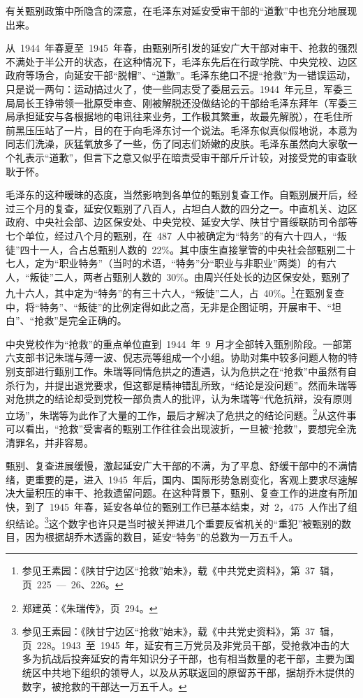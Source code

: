 有关甄别政策中所隐含的深意，在毛泽东对延安受审干部的“道歉”中也充分地展现出来。

从~1944~年春夏至~1945~年春，由甄别所引发的延安广大干部对审干、抢救的强烈不满处于半公开的状态，在这种情况下，毛泽东先后在行政学院、中央党校、边区政府等场合，向延安干部“脱帽”、“道歉”。毛泽东绝口不提“抢救”为一错误运动，只是说一两句：运动搞过火了，使一些同志受了委屈云云。1944~年元旦，军委三局局长王铮带领一批原受审查、刚被解脱还没做结论的干部给毛泽东拜年（军委三局承担延安与各根据地的电讯往来业务，工作极其繁重，故最先解脱），在毛住所前黑压压站了一片，目的在于向毛泽东讨一个说法。毛泽东似真似假地说，本意为同志们洗澡，灰猛氧放多了一些，伤了同志们娇嫩的皮肤。毛泽东虽然向大家敬一个礼表示“道歉”，但言下之意又似乎在暗责受审干部斤斤计较，对接受党的审查耿耿于怀。

毛泽东的这种暧昧的态度，当然影响到各单位的甄别复查工作。自甄别展开后，经过三个月的复查，延安仅甄别了八百人，占坦白人数的四分之一。中直机关、边区政府、中央社会部、边区保安处、中央党校、延安大学、陕甘宁晋绥联防司令部等七个单位，经过八个月的甄别，在~487~人中被确定为“特务”的有六十四人，“叛徒”四十一人，合占总甄别人数的~22\%。其中康生直接掌管的中央社会部甄别二十七人，定为“职业特务”（当时的术语，“特务”分“职业与非职业”两类）的有六人，“叛徒”二人，两者占甄别人数的~30\%。由周兴任处长的边区保安处，甄别了九十六人，其中定为“特务”的有三十六人，“叛徒”二人，占~40\%。\footnote{参见王素园：《陕甘宁边区“抢救”始未》，载《中共党史资料》，第~37~辑，页~225~—~26、226。}在甄别复查中，将“特务”、“叛徒”的比例定得如此之高，无非是企图证明，开展审干、“坦白”、“抢救”是完全正确的。

中央党校作为“抢救”的重点单位直到~1944~年~9~月才全部转入甄别阶段。一部第六支部书记朱瑞与薄一波、倪志亮等组成一个小组。协助对集中较多问题人物的特别支部进行甄别工作。朱瑞等同情危拱之的遭遇，认为危拱之在“抢救”中虽然有自杀行为，并提出退党要求，但这都是精神错乱所致，“结论是没问题”。然而朱瑞等对危拱之的结论却受到党校一部负责人的批评，认为朱瑞等“代危抗辩，没有原则立场”，朱瑞等为此作了大量的工作，最后才解决了危拱之的结论问题。\footnote{郑建英：《朱瑞传》，页~294。}从这件事可以看出，“抢救”受害者的甄别工作往往会出现波折，一旦被“抢救”，要想完全洗清罪名，并非容易。

甄别、复查进展缓慢，激起延安广大干部的不满，为了平息、舒缓干部中的不满情绪，更重要的是，进入~1945~年后，国内、国际形势急剧变化，客观上要求尽速解决大量积压的审干、抢救遗留问题。在这种背景下，甄别、复查工作的进度有所加快，到了~1945~年春，延安各单位的甄别工作已基本结束，对~2，475~人作出了组织结论。\footnote{参见王素园：《陕甘宁边区“抢救”始末》，载《中共党史资料》，第~37~辑，页~228。1943~至~1945~年，延安有三万党员及非党员干部，受抢救冲击的大多为抗战后投奔延安的青年知识分子干部，也有相当数量的老干部，主要为国统区中共地下组织的领导人，以及从苏联返回的原留苏干部，据胡乔木提供的数字，被抢救的干部达一万五千人。}这个数字也许只是当时被关押进几个重要反省机关的“重犯”被甄别的数目，因为根据胡乔木透露的数目，延安“特务”的总数为一万五千人。

